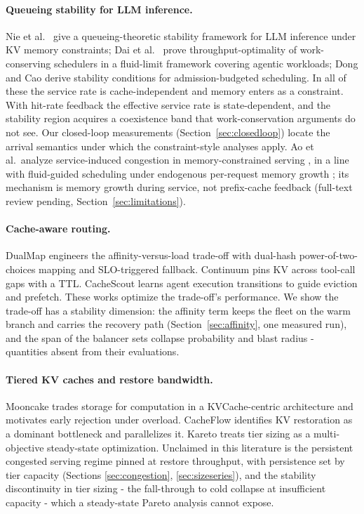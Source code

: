 \paragraph{Queueing stability for LLM inference.} Nie et al.\ \cite{nie2026queueing}
give a queueing-theoretic stability framework for LLM inference
under KV memory constraints; Dai et al.\ \cite{dai2025throughput} prove
throughput-optimality of work-conserving schedulers in a fluid-limit
framework covering agentic workloads; Dong and Cao \cite{dong2026flow}
derive stability conditions for admission-budgeted scheduling. In
all of these the service rate is cache-independent and memory enters
as a constraint. With hit-rate feedback the effective service rate
is state-dependent, and the stability region acquires a coexistence
band that work-conservation arguments do not see. Our closed-loop
measurements (Section~\ref{sec:closedloop}) locate the arrival semantics under which
the constraint-style analyses apply. Ao et al.\ analyze
service-induced congestion in memory-constrained serving
\cite{ao2026congestion}, in a line with fluid-guided scheduling under
endogenous per-request memory growth \cite{ao2025fluid}; its mechanism is
memory growth during service, not prefix-cache feedback (full-text
review pending, Section~\ref{sec:limitations}).

\paragraph{Cache-aware routing.} DualMap \cite{yuan2026dualmap} engineers the
affinity-versus-load trade-off with dual-hash power-of-two-choices
mapping and SLO-triggered fallback. Continuum \cite{li2025continuum} pins
KV across tool-call gaps with a TTL. CacheScout
\cite{zhang2026cachescout} learns agent execution transitions to guide
eviction and prefetch. These works optimize the trade-off's
performance. We show the trade-off has a stability dimension: the
affinity term keeps the fleet on the warm branch and carries the
recovery path (Section~\ref{sec:affinity}, one measured run), and the span of the
balancer sets collapse probability and blast radius - quantities
absent from their evaluations.

\paragraph{Tiered KV caches and restore bandwidth.} Mooncake \cite{qin2025mooncake}
trades storage for computation in a KVCache-centric architecture and
motivates early rejection under overload. CacheFlow
\cite{nian2026cacheflow} identifies KV restoration as a dominant
bottleneck and parallelizes it. Kareto \cite{zheng2026kareto} treats tier
sizing as a multi-objective steady-state optimization. Unclaimed in
this literature is the persistent congested serving regime pinned at
restore throughput, with persistence set by tier capacity (Sections
\ref{sec:congestion}, \ref{sec:sizeseries}), and the stability discontinuity in tier sizing - the
fall-through to cold collapse at insufficient capacity - which a
steady-state Pareto analysis cannot expose.


